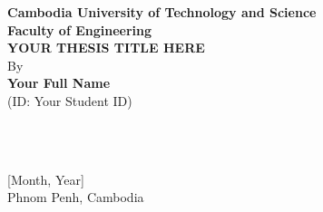 \newpage
\thispagestyle{empty}

\begin{center}
    
 {\Large\bfseries Cambodia University of Technology and Science}\\[0.25 cm]
    {\large\bfseries Faculty of Engineering}\\[4 cm]

    {\huge\bfseries YOUR THESIS TITLE HERE}\\[2cm]


    {\Large By}\\[0.5cm]
    {\Large\bfseries Your Full Name}\\[0.5cm]
    {\Large (ID: Your Student ID)}\\[3cm]
\end{center}
    \\[0.5cm]
    \\[2.5cm]
\begin{center}
    {\large [Month, Year] }\\

    {\large Phnom Penh, Cambodia}

    \vspace*{\fill} %
    
\end{center}